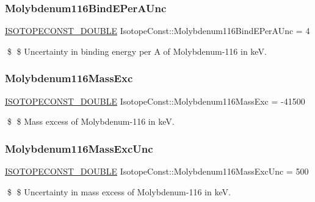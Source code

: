 \subsubsection{\texorpdfstring{Molybdenum116\+Bind\+E\+Per\+A\+Unc}{Molybdenum116BindEPerAUnc}}
{\footnotesize\ttfamily \mbox{\hyperlink{group___isotope_const-_macros_ga8f45a7272ce02c0b4c65c44636ed719a}{I\+S\+O\+T\+O\+P\+E\+C\+O\+N\+S\+T\+\_\+\+D\+O\+U\+B\+LE}} Isotope\+Const\+::\+Molybdenum116\+Bind\+E\+Per\+A\+Unc = 4}

\$ \$ Uncertainty in binding energy per A of Molybdenum-\/116 in keV. \mbox{\label{group___isotope_const-_molybdenum-_mo116_ga3b568523b965f40df7a47bafbc2fa670}} 
\subsubsection{\texorpdfstring{Molybdenum116\+Mass\+Exc}{Molybdenum116MassExc}}
{\footnotesize\ttfamily \mbox{\hyperlink{group___isotope_const-_macros_ga8f45a7272ce02c0b4c65c44636ed719a}{I\+S\+O\+T\+O\+P\+E\+C\+O\+N\+S\+T\+\_\+\+D\+O\+U\+B\+LE}} Isotope\+Const\+::\+Molybdenum116\+Mass\+Exc = -\/41500}

\$ \$ Mass excess of Molybdenum-\/116 in keV. \mbox{\label{group___isotope_const-_molybdenum-_mo116_ga483d5070289878da7dfd743b2ff50816}} 
\subsubsection{\texorpdfstring{Molybdenum116\+Mass\+Exc\+Unc}{Molybdenum116MassExcUnc}}
{\footnotesize\ttfamily \mbox{\hyperlink{group___isotope_const-_macros_ga8f45a7272ce02c0b4c65c44636ed719a}{I\+S\+O\+T\+O\+P\+E\+C\+O\+N\+S\+T\+\_\+\+D\+O\+U\+B\+LE}} Isotope\+Const\+::\+Molybdenum116\+Mass\+Exc\+Unc = 500}

\$ \$ Uncertainty in mass excess of Molybdenum-\/116 in keV. \mbox{\label{group___isotope_const-_molybdenum-_mo116_ga10a2ff592a86814ac973d01f1f9a413e}} 
